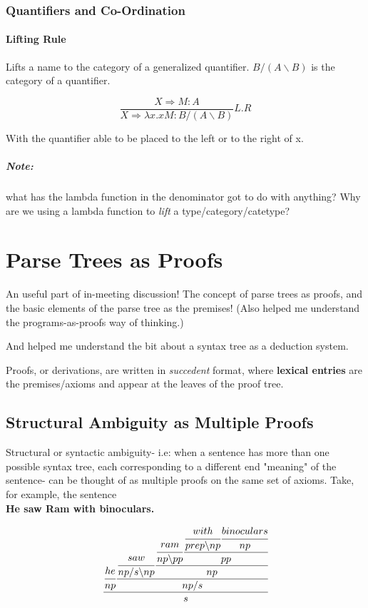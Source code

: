 \documentclass[letterpaper,12pt]{article}
\begin{document}
\subsubsection{Quantifiers and Co-Ordination}

\paragraph{Lifting Rule} Lifts a name to the category of a generalized
quantifier. $B/(A \backslash B)$ is the category of a quantifier.

\begin{equation}
  \frac {X \Rightarrow M : A}
  {X \Rightarrow \lambda x . xM : B/(A \backslash B)}
  L.R
\end{equation}

With the quantifier able to be placed to the left or to the right of x.

\subparagraph{Note:} what has the lambda function in the denominator got to do
with anything? Why are we using a lambda function to \emph{lift} a
type/category/catetype?


\section{Parse Trees as Proofs}

An useful part of in-meeting discussion! The concept of parse trees as proofs, and the basic elements of the parse tree as the premises! (Also helped me understand the programs-as-proofs way of thinking.)

And helped me understand the bit about a syntax tree as a deduction system.

Proofs, or derivations, are written in \emph{succedent} format, where \textbf{lexical entries} are the premises/axioms and appear at the leaves of the proof tree. 

\subsection{Structural Ambiguity as Multiple Proofs}

Structural or syntactic ambiguity- i.e: when a sentence has more than one possible syntax tree, each corresponding to a different end "meaning" of the sentence- can be thought of as multiple proofs on the same set of axioms. Take, for example, the sentence \\
\textbf{He saw Ram with binoculars.}

\begin{equation}
\cfrac
{	\cfrac {he} {np} 
 	\cfrac 
    {	\cfrac {saw} {np/s \backslash np} 
     	\cfrac
	    {	\cfrac {ram} {np \backslash pp}
	        \cfrac 
	    	{	\cfrac {with} {prep \backslash np}
	    	 	\cfrac {binoculars} {np}
	    	} 
	    	{pp}
	    }
	    {np}
	}
	{np/s}
} 
{s}
\end{equation}
\end{document}
